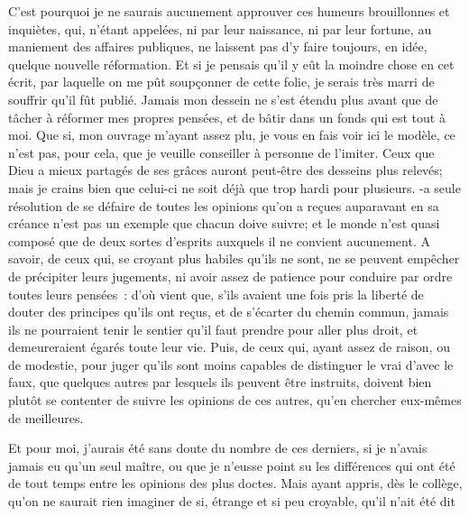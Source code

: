 \documentclass[french,twoside]{book} %
\begin{document}
C'est pourquoi je ne saurais aucunement approuver ces humeurs brouillonnes et inquiètes, qui, n'étant appelées, ni par leur naissance, ni par leur fortune, au maniement des affaires publiques, ne laissent pas d'y faire toujours, en idée, quelque nouvelle réformation. Et si je pensais qu'il y eût la moindre chose en cet écrit, par laquelle on me pût soupçonner de cette folie, je serais très marri de souffrir qu'il fût publié. Jamais mon dessein ne s'est étendu plus avant que de tâcher à réformer mes propres pensées, et de bâtir dans un fonds qui est tout à moi. Que si, mon ouvrage m'ayant assez plu, je vous en fais voir ici le modèle, ce n'est pas, pour cela, que je veuille conseiller à personne de l'imiter. Ceux que Dieu a mieux partagés de ses grâces auront peut-être des desseins plus relevés; mais je crains bien que celui-ci ne soit déjà que trop hardi pour plusieurs. -a seule résolution de se défaire de toutes les opinions qu'on a reçues auparavant en sa créance n'est pas un exemple que chacun doive suivre; et le monde n'est quasi composé que de deux sortes d'esprits auxquels il ne convient aucunement. A savoir, de ceux qui, se croyant plus habiles qu'ils ne sont, ne se peuvent empêcher de précipiter leurs jugements, ni avoir assez de patience pour conduire par ordre toutes leurs pensées : d'où vient que, s'ils avaient une fois pris la liberté de douter des principes qu'ils ont reçus, et de s'écarter du chemin commun, jamais ils ne pourraient tenir le sentier qu'il faut prendre pour aller plus droit, et demeureraient égarés toute leur vie. Puis, de ceux qui, ayant assez de raison, ou de modestie, pour juger qu'ils sont moins capables de distinguer le vrai d'avec le faux, que quelques autres par lesquels ils peuvent être instruits, doivent bien plutôt se contenter de suivre les opinions de ces autres, qu'en chercher eux-mêmes de meilleures.\par
Et pour moi, j'aurais été sans doute du nombre de ces derniers, si je n'avais jamais eu qu'un seul maître, ou que je n'eusse point su les différences qui ont été de tout temps entre les opinions des plus doctes. Mais ayant appris, dès le collège, qu'on ne saurait rien imaginer de si, étrange et si peu croyable, qu'il n'ait été dit\par
\end{document}

